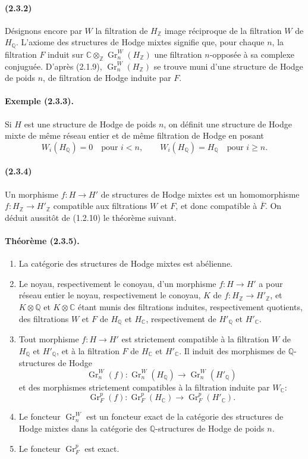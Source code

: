 \documentclass[10pt]{article}
\newcommand{\C}{\mathbb C}
\newcommand{\Q}{\mathbb Q}
\newcommand{\Z}{\mathbb Z}
\newcommand{\Gr}{\operatorname{Gr}}
\begin{document}
\paragraph{(2.3.2)} Désignons encore par $W$ la filtration de $H_\Z$ image réciproque de la filtration $W$ de $H_\Q$. L'axiome des structures de Hodge mixtes signifie que, pour chaque $n$, la filtration $F$ induit sur $\C\otimes_\Z\Gr_n^W(H_\Z)$ une filtration $n$-opposée à sa complexe conjuguée. D'après (2.1.9), $\Gr_n^W(H_\Z)$ se trouve muni d'une structure de Hodge de poids $n$, de filtration de Hodge induite par $F$.

\paragraph{Exemple (2.3.3).} Si $H$ est une structure de Hodge de poids $n$, on définit une structure de Hodge mixte de même réseau entier et de même filtration de Hodge en posant
\[
W_i(H_\Q)=0\quad\text{pour } i<n,\qquad
W_i(H_\Q)=H_\Q\quad\text{pour } i\ge n.
\]

\paragraph{(2.3.4)} Un morphisme $f:H\to H'$ de structures de Hodge mixtes est un homomorphisme $f:H_\Z\to H'_\Z$ compatible aux filtrations $W$ et $F$, et donc compatible à $\overline F$. On déduit aussitôt de (1.2.10) le théorème suivant.

\paragraph{Théorème (2.3.5).} 
\begin{enumerate}[label=(\roman*)]
\item La catégorie des structures de Hodge mixtes est abélienne.
\item Le noyau, respectivement le conoyau, d'un morphisme $f:H\to H'$ a pour réseau entier le noyau, respectivement le conoyau, $K$ de $f:H_\Z\to H'_\Z$, et $K\otimes\Q$ et $K\otimes\C$ étant munis des filtrations induites, respectivement quotients, des filtrations $W$ et $F$ de $H_\Q$ et $H_\C$, respectivement de $H'_\Q$ et $H'_\C$.
\item Tout morphisme $f:H\to H'$ est strictement compatible à la filtration $W$ de $H_\Q$ et $H'_\Q$, et à la filtration $F$ de $H_\C$ et $H'_\C$. Il induit des morphismes de $\Q$-structures de Hodge
\[
\Gr_n^W(f):\Gr_n^W(H_\Q)\longrightarrow\Gr_n^W(H'_\Q)
\]
et des morphismes strictement compatibles à la filtration induite par $W_\C$:
\[
\Gr_F^p(f):\Gr_F^p(H_\C)\longrightarrow\Gr_F^p(H'_\C).
\]
\item Le foncteur $\Gr_n^W$ est un foncteur exact de la catégorie des structures de Hodge mixtes dans la catégorie des $\Q$-structures de Hodge de poids $n$.
\item Le foncteur $\Gr_F^p$ est exact.
\end{enumerate}
\end{document}
